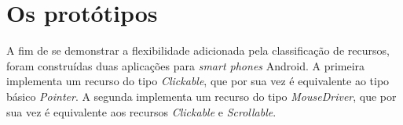 \section{Os protótipos}
\label{sec:osPrototipos}

A fim de se demonstrar a flexibilidade adicionada pela classificação de recursos, foram construídas duas aplicações para \emph{smart phones} Android. A primeira implementa um recurso do tipo \emph{Clickable}, que por sua vez é equivalente ao tipo básico \emph{Pointer}. A segunda implementa um recurso do tipo \emph{MouseDriver}, que por sua vez é equivalente aos recursos \emph{Clickable} e \emph{Scrollable}.